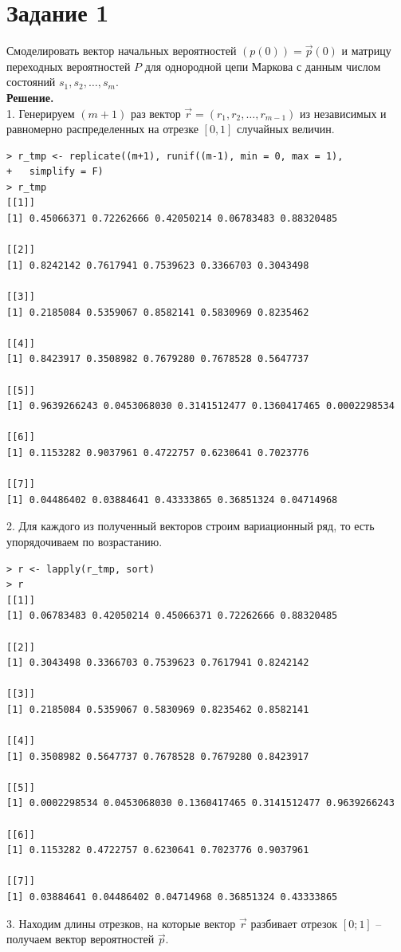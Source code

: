 \documentclass[14pt,a4paper]{scrartcl}
\begin{document}
\section*{Задание 1}

Смоделировать вектор начальных вероятностей $(p(0)) = \vec{p}(0)$ и матрицу переходных вероятностей $P$ для однородной цепи Маркова с данным числом состояний ${s_1,s_2,…,s_m}$.\\
\textbf{Решение.}\\
1. Генерируем $(m+1)$ раз вектор $\vec{r}=(r_1,r_2,…,r_{m-1})$ из независимых и равномерно распределенных на отрезке $[0,1]$ случайных величин.
\begin{verbatim}
> r_tmp <- replicate((m+1), runif((m-1), min = 0, max = 1), 
+	simplify = F)
> r_tmp
[[1]]
[1] 0.45066371 0.72262666 0.42050214 0.06783483 0.88320485

[[2]]
[1] 0.8242142 0.7617941 0.7539623 0.3366703 0.3043498

[[3]]
[1] 0.2185084 0.5359067 0.8582141 0.5830969 0.8235462

[[4]]
[1] 0.8423917 0.3508982 0.7679280 0.7678528 0.5647737

[[5]]
[1] 0.9639266243 0.0453068030 0.3141512477 0.1360417465 0.0002298534

[[6]]
[1] 0.1153282 0.9037961 0.4722757 0.6230641 0.7023776

[[7]]
[1] 0.04486402 0.03884641 0.43333865 0.36851324 0.04714968
\end{verbatim}


2. Для каждого из полученный векторов строим вариационный ряд, то есть упорядочиваем по возрастанию.

\begin{verbatim}
> r <- lapply(r_tmp, sort)
> r
[[1]]
[1] 0.06783483 0.42050214 0.45066371 0.72262666 0.88320485

[[2]]
[1] 0.3043498 0.3366703 0.7539623 0.7617941 0.8242142

[[3]]
[1] 0.2185084 0.5359067 0.5830969 0.8235462 0.8582141

[[4]]
[1] 0.3508982 0.5647737 0.7678528 0.7679280 0.8423917

[[5]]
[1] 0.0002298534 0.0453068030 0.1360417465 0.3141512477 0.9639266243

[[6]]
[1] 0.1153282 0.4722757 0.6230641 0.7023776 0.9037961

[[7]]
[1] 0.03884641 0.04486402 0.04714968 0.36851324 0.43333865
\end{verbatim}

3. Находим длины отрезков, на которые вектор $\vec{r}$ разбивает отрезок $[0;1]$ -- получаем вектор вероятностей $\vec{p}$.
\end{document}

